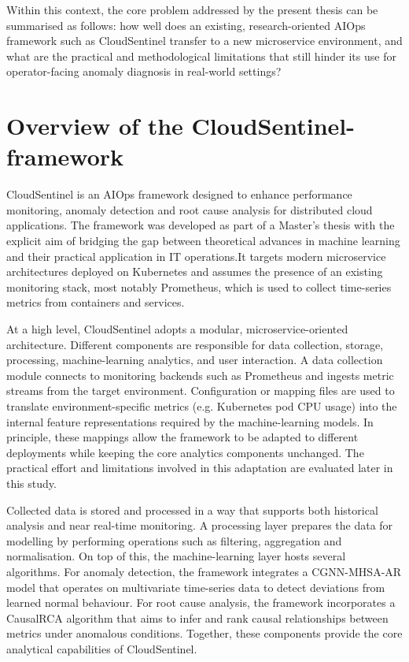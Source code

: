 Within this context, the core problem addressed by the present thesis can be summarised as follows: how well does an existing, research-oriented AIOps framework such as CloudSentinel transfer to a new microservice environment, and what are the practical and methodological limitations that still hinder its use for operator-facing anomaly diagnosis in real-world settings?

\section{Overview of the CloudSentinel-framework}
CloudSentinel is an AIOps framework designed to enhance performance monitoring, anomaly detection and root cause analysis for distributed cloud applications. The framework was developed as part of a Master’s thesis with the explicit aim of bridging the gap between theoretical advances in machine learning and their practical application in IT operations.It targets modern microservice architectures deployed on Kubernetes and assumes the presence of an existing monitoring stack, most notably Prometheus, which is used to collect time-series metrics from containers and services.

At a high level, CloudSentinel adopts a modular, microservice-oriented architecture. Different components are responsible for data collection, storage, processing, machine-learning analytics, and user interaction. A data collection module connects to monitoring backends such as Prometheus and ingests metric streams from the target environment. Configuration or mapping files are used to translate environment-specific metrics (e.g. Kubernetes pod CPU usage) into the internal feature representations required by the machine-learning models. In principle, these mappings allow the framework to be adapted to different deployments while keeping the core analytics components unchanged. The practical effort and limitations involved in this adaptation are evaluated later in this study.

Collected data is stored and processed in a way that supports both historical analysis and near real-time monitoring. A processing layer prepares the data for modelling by performing operations such as filtering, aggregation and normalisation. On top of this, the machine-learning layer hosts several algorithms. For anomaly detection, the framework integrates a CGNN-MHSA-AR model that operates on multivariate time-series data to detect deviations from learned normal behaviour. For root cause analysis, the framework incorporates a CausalRCA algorithm that aims to infer and rank causal relationships between metrics under anomalous conditions. Together, these components provide the core analytical capabilities of CloudSentinel.

